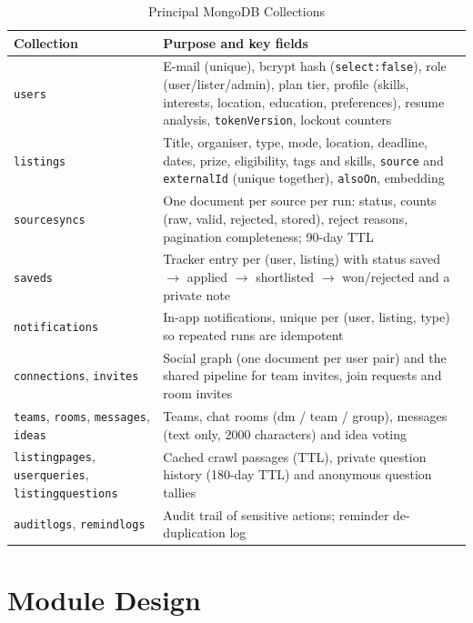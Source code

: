 \documentclass[12pt,a4paper]{report}
\begin{document}
\begin{table}[H]
\centering
\caption{Principal MongoDB Collections}
\begin{tabularx}{\textwidth}{|l|X|}
\hline
\textbf{Collection} & \textbf{Purpose and key fields} \\
\hline
\texttt{users} & E-mail (unique), bcrypt hash (\texttt{select:false}), role (user/lister/admin), plan tier, profile (skills, interests, location, education, preferences), resume analysis, \texttt{tokenVersion}, lockout counters \\
\hline
\texttt{listings} & Title, organiser, type, mode, location, deadline, dates, prize, eligibility, tags and skills, \texttt{source} and \texttt{externalId} (unique together), \texttt{alsoOn}, embedding \\
\hline
\texttt{sourcesyncs} & One document per source per run: status, counts (raw, valid, rejected, stored), reject reasons, pagination completeness; 90-day TTL \\
\hline
\texttt{saveds} & Tracker entry per (user, listing) with status saved $\rightarrow$ applied $\rightarrow$ shortlisted $\rightarrow$ won/rejected and a private note \\
\hline
\texttt{notifications} & In-app notifications, unique per (user, listing, type) so repeated runs are idempotent \\
\hline
\texttt{connections}, \texttt{invites} & Social graph (one document per user pair) and the shared pipeline for team invites, join requests and room invites \\
\hline
\texttt{teams}, \texttt{rooms}, \texttt{messages}, \texttt{ideas} & Teams, chat rooms (dm / team / group), messages (text only, 2000 characters) and idea voting \\
\hline
\texttt{listingpages}, \texttt{userqueries}, \texttt{listingquestions} & Cached crawl passages (TTL), private question history (180-day TTL) and anonymous question tallies \\
\hline
\texttt{auditlogs}, \texttt{remindlogs} & Audit trail of sensitive actions; reminder de-duplication log \\
\hline
\end{tabularx}
\end{table}

\section{Module Design}
\end{document}
